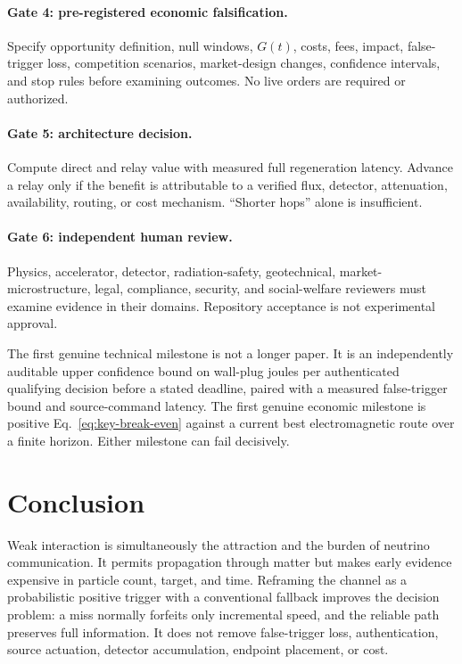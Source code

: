 \documentclass[11pt]{article}
\begin{document}
\paragraph{Gate 4: pre-registered economic falsification.} Specify opportunity definition, null windows, $G(t)$, costs, fees, impact, false-trigger loss, competition scenarios, market-design changes, confidence intervals, and stop rules before examining outcomes. No live orders are required or authorized.

\paragraph{Gate 5: architecture decision.} Compute direct and relay value with measured full regeneration latency. Advance a relay only if the benefit is attributable to a verified flux, detector, attenuation, availability, routing, or cost mechanism. ``Shorter hops'' alone is insufficient.

\paragraph{Gate 6: independent human review.} Physics, accelerator, detector, radiation-safety, geotechnical, market-microstructure, legal, compliance, security, and social-welfare reviewers must examine evidence in their domains. Repository acceptance is not experimental approval.

The first genuine technical milestone is not a longer paper. It is an independently auditable upper confidence bound on wall-plug joules per authenticated qualifying decision before a stated deadline, paired with a measured false-trigger bound and source-command latency. The first genuine economic milestone is positive Eq.~\eqref{eq:key-break-even} against a current best electromagnetic route over a finite horizon. Either milestone can fail decisively.

\section{Conclusion}

Weak interaction is simultaneously the attraction and the burden of neutrino communication. It permits propagation through matter but makes early evidence expensive in particle count, target, and time. Reframing the channel as a probabilistic positive trigger with a conventional fallback improves the decision problem: a miss normally forfeits only incremental speed, and the reliable path preserves full information. It does not remove false-trigger loss, authentication, source actuation, detector accumulation, endpoint placement, or cost.
\end{document}
